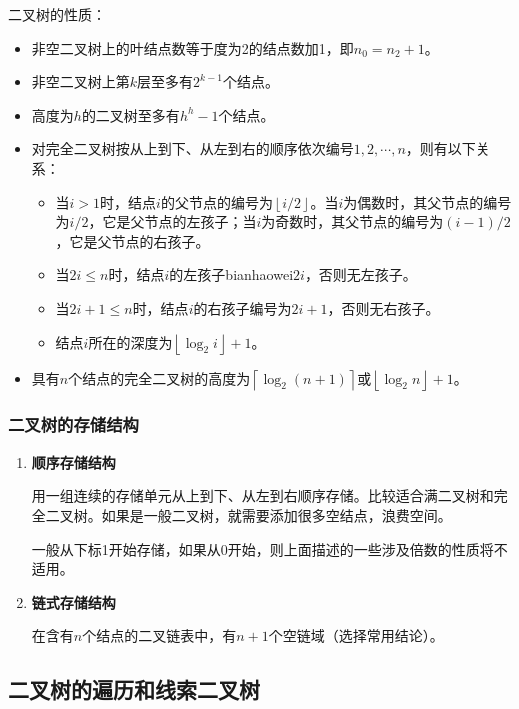 \documentclass[12pt, a4paper, oneside]{ctexart}
\begin{document}
二叉树的性质：
\begin{itemize}
  \item 非空二叉树上的叶结点数等于度为2的结点数加1，即$n_0=n_2+1$。
  \item 非空二叉树上第$k$层至多有$2^{k-1}$个结点。
  \item 高度为$h$的二叉树至多有$h^h-1$个结点。
  \item 对完全二叉树按从上到下、从左到右的顺序依次编号$1,2,\cdots,n$，则有以下关系：
  \begin{itemize}
    \item 当$i>1$时，结点$i$的父节点的编号为$\left\lfloor i/2 \right\rfloor$。当$i$为偶数时，其父节点的编号为$i/2$，它是父节点的左孩子；当$i$为奇数时，其父节点的编号为$(i-1)/2$，它是父节点的右孩子。
    \item 当$2i\leq n$时，结点$i$的左孩子bianhaowei$2i$，否则无左孩子。
    \item 当$2i+1\leq n$时，结点$i$的右孩子编号为$2i+1$，否则无右孩子。
    \item 结点$i$所在的深度为$\left\lfloor \log_2 i \right\rfloor +1$。
  \end{itemize}
  \item 具有$n$个结点的完全二叉树的高度为$\left\lceil \log_2 (n+1) \right\rceil$或$\left\lfloor \log_2 n \right\rfloor + 1$。
\end{itemize}

\subsubsection{二叉树的存储结构}

\begin{enumerate}
  \item {\bf 顺序存储结构}
  
  用一组连续的存储单元从上到下、从左到右顺序存储。比较适合满二叉树和完全二叉树。如果是一般二叉树，就需要添加很多空结点，浪费空间。

  一般从下标1开始存储，如果从0开始，则上面描述的一些涉及倍数的性质将不适用。

  \item {\bf 链式存储结构}
  
  在含有$n$个结点的二叉链表中，有$n+1$个空链域（选择常用结论）。
\end{enumerate}

\subsection{二叉树的遍历和线索二叉树}
\end{document}
